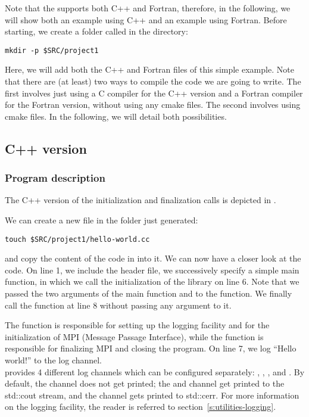 Note that the \Atlas supports both C++ and Fortran, therefore, 
in the following, we will show both an example using C++ and 
an example using Fortran. Before starting, we create a folder 
called  in the  directory:
%
\begin{lstlisting}[style=BashStyle]
mkdir -p $SRC/project1
\end{lstlisting}
%
Here, we will add both the C++ and Fortran files of this 
simple example. Note that there are (at least) two ways 
to compile the code we are going to write. The first involves 
just using a C compiler for the C++ version and a Fortran 
compiler for the Fortran version, without using any cmake 
files. The second involves using cmake files. In the following, 
we will detail both possibilities.

\subsection{C++ version}
\label{s:atlas-hello-world-C}

\subsubsection*{Program description}
The C++ version of the \Atlas initialization and finalization
calls is depicted in .
%

%
We can create a new file in the folder  just generated:
%
\begin{lstlisting}[style=BashStyle]
touch $SRC/project1/hello-world.cc
\end{lstlisting}
%
and copy the content of the code in  into it.
We can now have a closer look at the code.
On line 1, we include the \Atlas header file, we successively 
specify a simple main function, in which we call the initialization 
of the \Atlas library on line 6.
Note that we passed the two arguments of the main function 
 and  to the  
function.
We finally call the \Atlas {} function 
at line 8 without passing any argument to it.

The function  is responsible for 
setting up the logging facility and for the initialization
of MPI (Message Passage Interface), 
while the function  
is responsible for finalizing MPI and closing the program.
On line 7, we log ``Hello world!'' to the  log
channel.\\
%
\Atlas provides 4 different log channels which can be configured
separately: , , , and
. By default, the  channel does not
get printed; the  and  channel get 
printed to the std::cout stream, and the  channel
gets printed to std::cerr. For more information on the logging
facility, the reader is referred to section~\ref{s:utilities-logging}.


